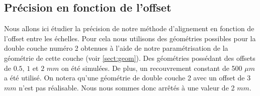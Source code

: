 %    
%    
%    
%    

   \subsection{Pr\'ecision en fonction de l'offset}

   Nous allons ici \'etudier la pr\'ecision de notre m\'ethode d'alignement en fonction de l'offset entre les \'echelles. Pour cela nous utilisons des g\'eom\'etries possibles pour la double couche num\'ero 2 obtenues \`a l'aide de notre param\'etrisation de la g\'eom\'etrie de cette couche (voir \ref{sect:geom}). Des g\'eom\'etries possédant des offsets de $0.5$, $1$ et $2$ $mm$ on \'et\'e simul\'ees. De plus, un recouvrement constant de 500 $\mu m$ a \'et\'e utilis\'e. On notera qu'une g\'eom\'etrie de double couche 2 avec un offset de 3 $mm$ n'est pas r\'ealisable. Nous nous sommes donc arr\^etés \`a une valeur de 2 $mm$.
   
